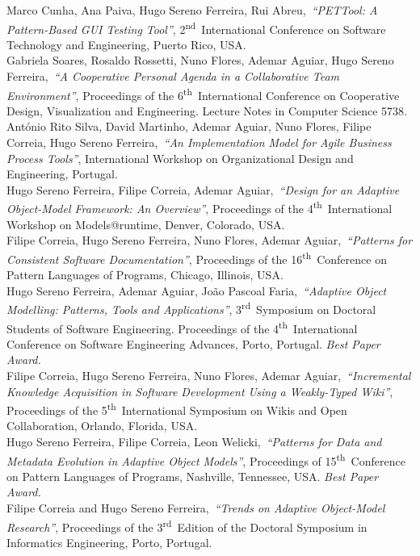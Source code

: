 \documentclass[9pt, a4paper, pstricks]{article}
\newcommand{\current}{{\hspace{-0.97em}\color{feup}$\star$}~}
\newcommand{\years}[1]{\marginnote{\small #1}}
\newcommand{\nth}{\textsuperscript{th}~}
\newcommand{\nd}{\textsuperscript{nd}~}
\newcommand{\rd}{\textsuperscript{rd}~}
\newcommand{\publication}[4]{\years{#1}#2,~\emph{``#3''}, #4}
\newcommand{\awardedpub}[4]{\years{\current~#1}#2,~\emph{``#3''}, #4 {\color{feup} \emph{Best Paper Award.}}}
\begin{document}
\publication{2010}{Marco Cunha, Ana Paiva, Hugo Sereno Ferreira, Rui Abreu}{PETTool: A Pattern-Based GUI Testing Tool}{2\nd International Conference on Software Technology and Engineering, Puerto Rico, USA.}\\
\publication{2009}{Gabriela Soares, Rosaldo Rossetti, Nuno Flores, Ademar Aguiar, Hugo Sereno Ferreira}{A Cooperative Personal Agenda in a Collaborative Team Environment}{Proceedings of the 6\nth International Conference on Cooperative Design, Visualization and Engineering. Lecture Notes in Computer Science 5738.}\\
\publication{2009}{António Rito Silva, David Martinho, Ademar Aguiar, Nuno Flores, Filipe Correia, Hugo Sereno Ferreira}{An Implementation Model for Agile Business Process Tools}{International Workshop on Organizational Design and Engineering, Portugal.}\\
\publication{2009}{Hugo Sereno Ferreira, Filipe Correia, Ademar Aguiar}{Design for an Adaptive Object-Model Framework: An Overview}{Proceedings of the 4\nth International Workshop on Models@runtime, Denver, Colorado, USA.}\\
\publication{2009}{Filipe Correia, Hugo Sereno Ferreira, Nuno Flores, Ademar Aguiar}{Patterns for Consistent Software Documentation}{Proceedings of the 16\nth Conference on Pattern Languages of Programs, Chicago, Illinois, USA.}\\
\awardedpub{2009}{Hugo Sereno Ferreira, Ademar Aguiar, João Pascoal Faria}{Adaptive Object Modelling: Patterns, Tools and Applications}{3\rd Symposium on Doctoral Students of Software Engineering. Proceedings of the 4\nth International Conference on Software Engineering Advances, Porto, Portugal.}\\
\publication{2009}{Filipe Correia, Hugo Sereno Ferreira, Nuno Flores, Ademar Aguiar}{Incremental Knowledge Acquisition in Software Development Using a Weakly-Typed Wiki}{Proceedings of the 5\nth International Symposium on Wikis and Open Collaboration, Orlando, Florida, USA.}\\
\awardedpub{2008}{Hugo Sereno Ferreira, Filipe Correia, Leon Welicki}{Patterns for Data and Metadata Evolution in Adaptive Object Models}{Proceedings of 15\nth Conference on Pattern Languages of Programs, Nashville, Tennessee, USA.}\\
\publication{2008}{Filipe Correia and Hugo Sereno Ferreira}{Trends on Adaptive Object-Model Research}{Proceedings of the 3\rd Edition of the Doctoral Symposium in Informatics Engineering, Porto, Portugal.}
\end{document}
